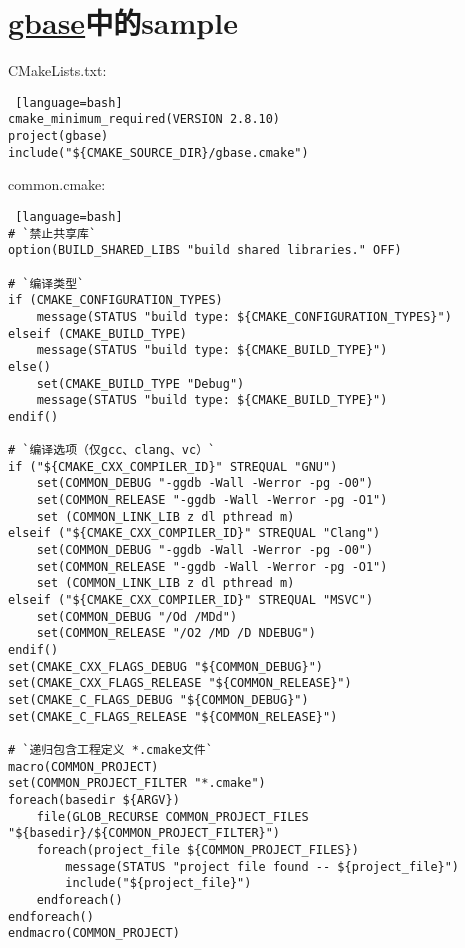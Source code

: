 \section{\ZHH \href{https://github.com/gaccob/gbase}{gbase}中的sample}{
{CMakeLists.txt:} \par
\begin{lstlisting} [language=bash]
cmake_minimum_required(VERSION 2.8.10)
project(gbase)
include("${CMAKE_SOURCE_DIR}/gbase.cmake")
\end{lstlisting}

{common.cmake:} \par
\begin{lstlisting} [language=bash]
# `禁止共享库`
option(BUILD_SHARED_LIBS "build shared libraries." OFF)

# `编译类型`
if (CMAKE_CONFIGURATION_TYPES)
    message(STATUS "build type: ${CMAKE_CONFIGURATION_TYPES}")
elseif (CMAKE_BUILD_TYPE)
    message(STATUS "build type: ${CMAKE_BUILD_TYPE}")
else()
    set(CMAKE_BUILD_TYPE "Debug")
    message(STATUS "build type: ${CMAKE_BUILD_TYPE}")
endif()

# `编译选项（仅gcc、clang、vc）`
if ("${CMAKE_CXX_COMPILER_ID}" STREQUAL "GNU")
    set(COMMON_DEBUG "-ggdb -Wall -Werror -pg -O0")
    set(COMMON_RELEASE "-ggdb -Wall -Werror -pg -O1")
    set (COMMON_LINK_LIB z dl pthread m)
elseif ("${CMAKE_CXX_COMPILER_ID}" STREQUAL "Clang")
    set(COMMON_DEBUG "-ggdb -Wall -Werror -pg -O0")
    set(COMMON_RELEASE "-ggdb -Wall -Werror -pg -O1")
    set (COMMON_LINK_LIB z dl pthread m)
elseif ("${CMAKE_CXX_COMPILER_ID}" STREQUAL "MSVC")
    set(COMMON_DEBUG "/Od /MDd")
    set(COMMON_RELEASE "/O2 /MD /D NDEBUG")
endif()
set(CMAKE_CXX_FLAGS_DEBUG "${COMMON_DEBUG}")
set(CMAKE_CXX_FLAGS_RELEASE "${COMMON_RELEASE}")
set(CMAKE_C_FLAGS_DEBUG "${COMMON_DEBUG}")
set(CMAKE_C_FLAGS_RELEASE "${COMMON_RELEASE}")

# `递归包含工程定义 *.cmake文件`
macro(COMMON_PROJECT)
set(COMMON_PROJECT_FILTER "*.cmake")
foreach(basedir ${ARGV})
    file(GLOB_RECURSE COMMON_PROJECT_FILES "${basedir}/${COMMON_PROJECT_FILTER}")
    foreach(project_file ${COMMON_PROJECT_FILES})
        message(STATUS "project file found -- ${project_file}")
        include("${project_file}")
    endforeach()
endforeach()
endmacro(COMMON_PROJECT)


\end{lstlisting}}

